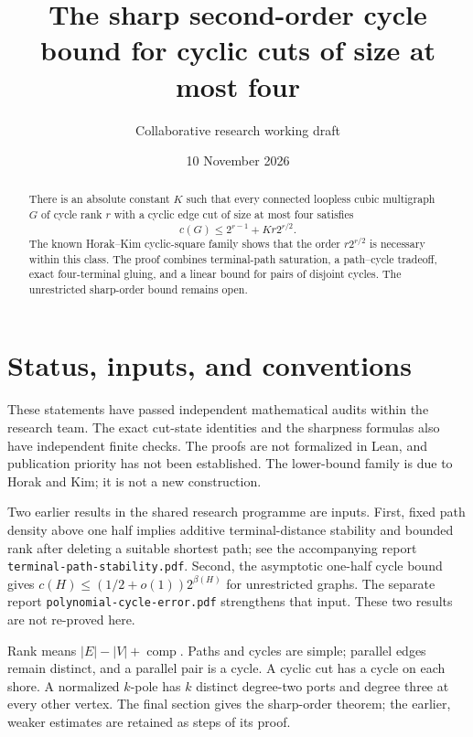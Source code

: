 \documentclass[11pt]{article}
\title{The sharp second-order cycle bound for cyclic cuts of size at most four}
\author{Collaborative research working draft}
\date{10 November 2026}
\begin{document}
\maketitle
\begin{abstract}
There is an absolute constant $K$ such that every connected loopless cubic multigraph $G$ of cycle rank $r$ with a cyclic edge cut of size at most four satisfies
\[
 c(G)\le 2^{r-1}+Kr2^{r/2}.
\]
The known Horak--Kim cyclic-square family shows that the order $r2^{r/2}$ is necessary within this class.
The proof combines terminal-path saturation, a path--cycle tradeoff, exact four-terminal gluing, and a linear bound for pairs of disjoint cycles.
The unrestricted sharp-order bound remains open.
\end{abstract}

\section*{Status, inputs, and conventions}
These statements have passed independent mathematical audits within the research team.
The exact cut-state identities and the sharpness formulas also have independent finite checks.
The proofs are not formalized in Lean, and publication priority has not been established.
The lower-bound family is due to Horak and Kim; it is not a new construction.

Two earlier results in the shared research programme are inputs.
First, fixed path density above one half implies additive terminal-distance stability and bounded rank after deleting a suitable shortest path; see the accompanying report \nolinkurl{terminal-path-stability.pdf}.
Second, the asymptotic one-half cycle bound gives $c(H)\le(1/2+o(1))2^{\beta(H)}$ for unrestricted graphs.
The separate report \nolinkurl{polynomial-cycle-error.pdf} strengthens that input.
These two results are not re-proved here.

Rank means $|E|-|V|+\operatorname{comp}$.
Paths and cycles are simple; parallel edges remain distinct, and a parallel pair is a cycle.
A cyclic cut has a cycle on each shore.
A normalized $k$-pole has $k$ distinct degree-two ports and degree three at every other vertex.
The final section gives the sharp-order theorem; the earlier, weaker estimates are retained as steps of its proof.

\clearpage
\tableofcontents












\end{document}
